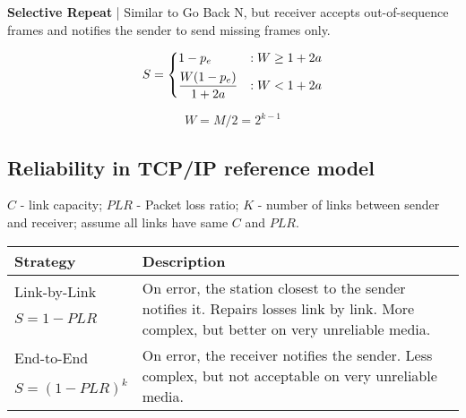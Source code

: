 \documentclass{form}
\begin{document}
\begin{minipage}[c]{0.495\textwidth}
    \textbf{Selective Repeat} |
    Similar to Go Back N, but receiver accepts out-of-sequence frames and notifies the sender to send missing frames only.

    \begin{minipage}{60mm}
        \begin{equation*}
            S = \begin{dcases}
                1-p_e                 & : W \geq 1+2a \\
                \frac{W(1-p_e)}{1+2a} & : W < 1+2a
            \end{dcases}
        \end{equation*}
    \end{minipage}
    \begin{minipage}{30mm}
        \begin{equation*}
            W = M/2 = 2^{k-1}
        \end{equation*}
    \end{minipage}

    \subsection*{Reliability in TCP/IP reference model}
    $C$ - link capacity; $PLR$ - Packet loss ratio; $K$ - number of links between sender and receiver; assume all links have same $C$ and $PLR$.
    \begin{center}
        \begin{tabular}{@{}p{24mm} | p{60mm}}
            \textbf{Strategy} & \textbf{Description} \\ \hline
            Link-by-Link & \multirow{4}{60mm}{On error, the station closest to the sender notifies it. Repairs losses link by link. More complex, but better on very unreliable media.} \\ $S=1-PLR$ \\ \\ \\
            End-to-End   & \multirow{3}{60mm}{On error, the receiver notifies the sender. Less complex, but not acceptable on very unreliable media.} \\ $S=(1-PLR)^k$ \\ \\
        \end{tabular}
    \end{center}
\end{minipage}
\end{document}
